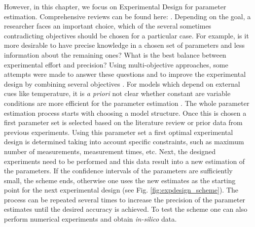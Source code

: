 \documentclass[10pt,A4paper]{article}
\begin{document}
However, in this chapter, we focus on Experimental Design for parameter estimation. 
Comprehensive reviews can be found here: \cite{atkinsonDevelopmentsDesignExperiments1982, franceschiniModelbasedDesignExperiments2008,sunParameterEstimation2011,vilasPredictiveFood2016}. 
Depending on the goal, a researcher faces an important choice, which of the several sometimes contradicting objectives should be chosen for a particular case. 
For example, is it more desirable to have precise knowledge in a chosen set of parameters and less information about the remaining ones? What is the best balance between experimental effort and precision? 
Using multi-objective approaches, some attempts were made to answer these questions and to improve the experimental design by combining several objectives \cite{telenOptimalExperimentDesign2012, logistRobustMultiobjectiveOptimal2011}. 
For models which depend on external cues like temperature, it is {\it a priori} not clear whether constant are variable conditions are more efficient for the parameter estimation \cite{versyckIntroducingOptimal1999,garciaQualityShelflifePrediction2015}. 
The whole parameter estimation process starts with choosing a model structure. Once this is chosen a first parameter set is selected based on the literature review or prior data from previous experiments. 
Using this parameter set a first optimal experimental design is determined taking into account specific constraints, such as maximum number of measurements, measurement times, etc. Next, the designed experiments need to be performed and this data result into a new estimation of the parameters. 
If the confidence intervals of the parameters are sufficiently small, the scheme ends, otherwise one uses the new estimates as the starting point for the next experimental design (see Fig. \ref{fig:expdesign_scheme}). 
The process can be repeated several times to increase the precision of the parameter estimates until the desired accuracy is achieved. 
To test the scheme one can also perform numerical experiments and obtain {\it in-silico} data. 
\end{document}
